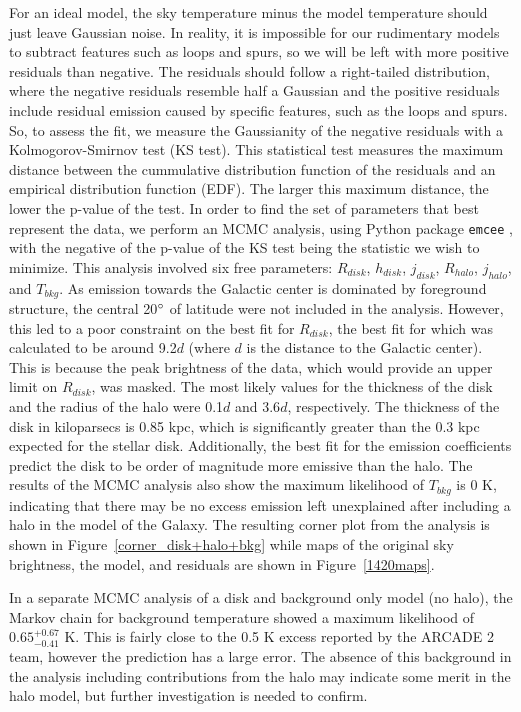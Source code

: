 \documentclass[%
onecolumn,
11pt,
tightenlines,
notitlepage,
superscriptaddress,
nofootinbib,
amsmath,amssymb,
aps,
pra,
]{revtex4-1}
\begin{document}
For an ideal model, the sky temperature minus the model temperature should just leave Gaussian noise. In reality, it is impossible for our rudimentary models to subtract  features such as loops and spurs, so we will be left with more positive residuals than negative. The residuals should follow a right-tailed distribution, where the negative residuals resemble half a Gaussian and the positive residuals include residual emission caused by specific features, such as the loops and spurs. So, to assess the fit, we measure the Gaussianity of the negative residuals with a Kolmogorov-Smirnov test (KS test). This statistical test measures the maximum distance between the cummulative distribution function of the residuals and an empirical distribution function (EDF). The larger this maximum distance, the lower the p-value of the test. In order to find the set of parameters that best represent the data, we perform an MCMC analysis, using Python package \texttt{emcee}  \citep{emcee}, with the negative of the p-value of the KS test being the statistic we wish to minimize. This analysis involved six free parameters: $R_{disk}$, $h_{disk}$, $j_{disk}$, $R_{halo}$, $j_{halo}$, and $T_{bkg}$. As emission towards the Galactic center is dominated by foreground structure, the central 20$\degree$ of latitude were not included in the analysis. However, this led to a poor constraint on the best fit for $R_{disk}$, the best fit for which was calculated to be around 9.2$d$ (where $d$ is the distance to the Galactic center). This is because the peak brightness of the data, which would provide an upper limit on $R_{disk}$, was masked. The most likely values for the thickness of the disk and the radius of the halo were 0.1$d$ and 3.6$d$, respectively. The thickness of the disk in kiloparsecs is 0.85 kpc, which is significantly greater than the 0.3 kpc expected for the stellar disk. Additionally, the best fit for the emission coefficients predict the disk to be order of magnitude more emissive than the halo. The results of the MCMC analysis also show the maximum likelihood of $T_{bkg}$ is 0 K, indicating that there may be no excess emission left unexplained after including a halo in the model of the Galaxy. The resulting corner plot from the analysis is shown in Figure~\ref{corner_disk+halo+bkg} while maps of the original sky brightness, the model, and residuals are shown in Figure~\ref{1420maps}. 

In a separate MCMC analysis of a disk and background only model (no halo), the Markov chain for background temperature showed a maximum likelihood of $0.65^{+0.67}_{-0.41}$ K. This is fairly close to the 0.5 K excess reported by the ARCADE 2 team, however the prediction has a large error. The absence of this background in the analysis including contributions from the halo may indicate some merit in the halo model, but further investigation is needed to confirm.
\end{document}
